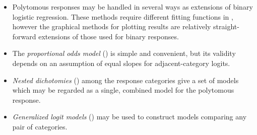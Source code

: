 \begin{itemize}
\item Polytomous responses may be handled in several ways as extensions of binary
logistic regression.  These methods require different fitting functions in \R,
however the graphical methods for plotting results are relatively straight-forward
extensions of those used for binary responses.
 \item The \emph{proportional odds model} () is simple and convenient, but its validity
depends
on an assumption of equal slopes for adjacent-category logits.
 \item \emph{Nested dichotomies} () among the response categories give a set of models
which may be regarded as a single, combined model for the polytomous
response.
 \item \emph{Generalized logit models} ()
 may be used to construct models comparing any pair of categories.

\end{itemize}

